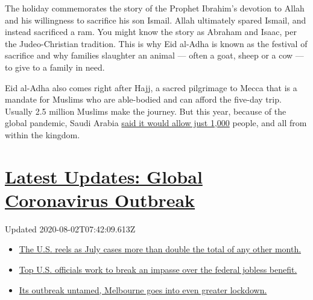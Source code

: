 The holiday commemorates the story of the Prophet Ibrahim's devotion to
Allah and his willingness to sacrifice his son Ismail. Allah ultimately
spared Ismail, and instead sacrificed a ram. You might know the story as
Abraham and Isaac, per the Judeo-Christian tradition. This is why Eid
al-Adha is known as the festival of sacrifice and why families slaughter
an animal --- often a goat, sheep or a cow --- to give to a family in
need.

Eid al-Adha also comes right after Hajj, a sacred pilgrimage to Mecca
that is a mandate for Muslims who are able-bodied and can afford the
five-day trip. Usually 2.5 million Muslims make the journey. But this
year, because of the global pandemic, Saudi Arabia
\href{https://www.nytimes.com/2020/07/30/world/middleeast/pilgrims-hajj-mecca-coronavirus-pandemic.html}{said
it would allow just 1,000} people, and all from within the kingdom.

\hypertarget{latest-updates-global-coronavirus-outbreak}{%
\section{\texorpdfstring{\href{https://www.nytimes.com/2020/08/01/world/coronavirus-covid-19.html?action=click\&pgtype=Article\&state=default\&region=MAIN_CONTENT_1\&context=storylines_live_updates}{Latest
Updates: Global Coronavirus
Outbreak}}{Latest Updates: Global Coronavirus Outbreak}}\label{latest-updates-global-coronavirus-outbreak}}

Updated 2020-08-02T07:42:09.613Z

\begin{itemize}
\tightlist
\item
  \href{https://www.nytimes.com/2020/08/01/world/coronavirus-covid-19.html?action=click\&pgtype=Article\&state=default\&region=MAIN_CONTENT_1\&context=storylines_live_updates\#link-34047410}{The
  U.S. reels as July cases more than double the total of any other
  month.}
\item
  \href{https://www.nytimes.com/2020/08/01/world/coronavirus-covid-19.html?action=click\&pgtype=Article\&state=default\&region=MAIN_CONTENT_1\&context=storylines_live_updates\#link-780ec966}{Top
  U.S. officials work to break an impasse over the federal jobless
  benefit.}
\item
  \href{https://www.nytimes.com/2020/08/01/world/coronavirus-covid-19.html?action=click\&pgtype=Article\&state=default\&region=MAIN_CONTENT_1\&context=storylines_live_updates\#link-2bc8948}{Its
  outbreak untamed, Melbourne goes into even greater lockdown.}
\end{itemize}

